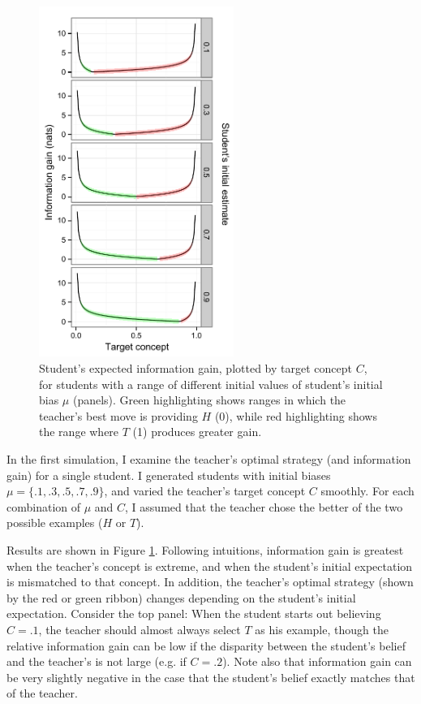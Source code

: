 \documentclass[10pt,letterpaper]{article}
\begin{document}
\begin{figure}[t]
\begin{center}
\includegraphics[width=2.5in]{figures/single_student_gain.pdf}
\end{center}
\caption{\label{fig:student} Student's expected information gain, plotted by target concept $C$, for students with a range of different initial values of student's initial bias $\mu$ (panels). Green highlighting shows ranges in which the teacher's best move is providing $H$ (0), while red highlighting shows the range where $T$ (1) produces greater gain.}
\end{figure}

In the first simulation, I examine the teacher's optimal strategy (and information gain) for a single student. I generated students with initial biases $\mu= \{.1, .3, .5, .7, .9\}$, and varied the teacher's target concept $C$ smoothly. For each combination of $\mu$ and $C$, I assumed that the teacher chose the better of the two possible examples ($H$ or $T$). 

Results are shown in Figure \ref{fig:student}. Following intuitions, information gain is greatest when the teacher's concept is extreme, and when the student's initial expectation is mismatched to that concept. In addition, the teacher's optimal strategy (shown by the red or green ribbon) changes depending on the student's initial expectation. Consider the top panel: When the student starts out believing $C=.1$, the teacher should almost always select $T$ as his example, though the relative information gain can be low if the disparity between the student's belief and the teacher's is not large (e.g. if $C=.2$). Note also that information gain can be very slightly negative in the case that the student's belief exactly matches that of the teacher.
\end{document}
